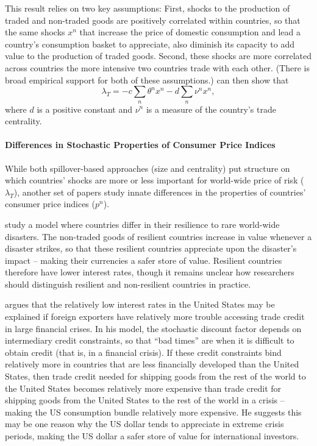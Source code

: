 \documentclass{ar-1col}
\begin{document}
This result relies on two key assumptions: First, shocks to the production of traded and non-traded goods are positively correlated within countries, so that the same shocks $x^n$ that increase the price of domestic consumption and lead a country's consumption basket to appreciate, also diminish its capacity to add value to the production of traded goods. Second, these shocks are more correlated across countries the more intensive two countries trade with each other. (There is broad empirical support for both of these assumptions.) \citet{Richmond2019} can then show that $$\lambda_{T} = -c \sum_{n} \theta^n x^n- d\sum_{n} \nu^n x^n,$$ where $d$ is a positive constant and $\nu^n$ is a measure of the country's trade centrality.


\paragraph*{Differences in Stochastic Properties of Consumer Price Indices}

While both spillover-based approaches (size and centrality) put structure on which countries' shocks are more or less important for world-wide price of risk ($\lambda_T$), another set of papers study innate differences in the properties of countries' consumer price indices ($p^n$).

\citet{FarhiGabaix2016} study a model where countries differ in their resilience to rare world-wide disasters. The non-traded goods of resilient countries increase in value whenever a disaster strikes, so that these resilient countries appreciate upon the disaster's impact -- making their currencies a safer store of value. Resilient countries therefore have lower interest rates, though it remains unclear how researchers should distinguish resilient and non-resilient countries in practice.

\citet{Maggiori2013} argues that the relatively low interest rates in the United States may be explained if foreign exporters have relatively more trouble accessing trade credit in large financial crises. In his model, the stochastic discount factor depends on intermediary credit constraints, so that ``bad times'' are when it is difficult to obtain credit (that is, in a financial crisis). If these credit constraints bind relatively more in countries that are less financially developed than the United States, then trade credit needed for shipping goods from the rest of the world to the United States becomes relatively more expensive than trade credit for shipping goods from the United States to the rest of the world in a crisis -- making the US consumption bundle relatively more expensive. He suggests this may be one reason why the US dollar tends to appreciate in extreme crisis periods, making the US dollar a safer store of value for international investors.
\end{document}

